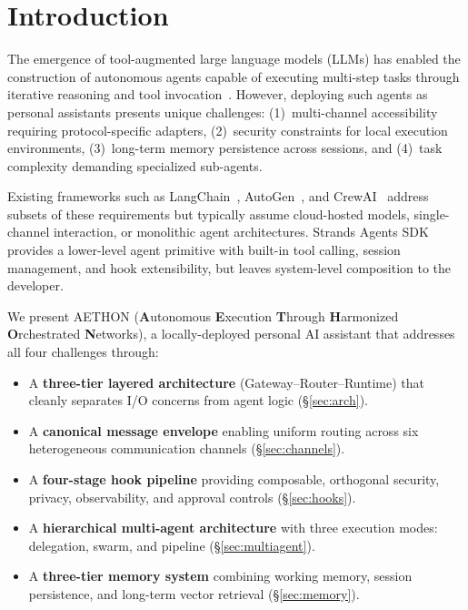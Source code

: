 \documentclass[9pt,twocolumn,letterpaper]{extarticle}
\begin{document}
\section{Introduction}
\label{sec:intro}

The emergence of tool-augmented large language models (LLMs) has enabled the construction of autonomous agents capable of executing multi-step tasks through iterative reasoning and tool invocation~\cite{schick2023toolformer,yao2023react}.
However, deploying such agents as personal assistants presents unique challenges: (1)~multi-channel accessibility requiring protocol-specific adapters, (2)~security constraints for local execution environments, (3)~long-term memory persistence across sessions, and (4)~task complexity demanding specialized sub-agents.

Existing frameworks such as LangChain~\cite{langchain2023}, AutoGen~\cite{wu2023autogen}, and CrewAI~\cite{crewai2024} address subsets of these requirements but typically assume cloud-hosted models, single-channel interaction, or monolithic agent architectures.
Strands Agents SDK~\cite{strands2025} provides a lower-level agent primitive with built-in tool calling, session management, and hook extensibility, but leaves system-level composition to the developer.

We present AETHON (\textbf{A}utonomous \textbf{E}xecution \textbf{T}hrough \textbf{H}armonized \textbf{O}rchestrated \textbf{N}etworks), a locally-deployed personal AI assistant that addresses all four challenges through:

\begin{itemize}[leftmargin=*,noitemsep,topsep=3pt]
  \item A \textbf{three-tier layered architecture} (Gateway--Router--Runtime) that cleanly separates I/O concerns from agent logic (\S\ref{sec:arch}).
  \item A \textbf{canonical message envelope} enabling uniform routing across six heterogeneous communication channels (\S\ref{sec:channels}).
  \item A \textbf{four-stage hook pipeline} providing composable, orthogonal security, privacy, observability, and approval controls (\S\ref{sec:hooks}).
  \item A \textbf{hierarchical multi-agent architecture} with three execution modes: delegation, swarm, and pipeline (\S\ref{sec:multiagent}).
  \item A \textbf{three-tier memory system} combining working memory, session persistence, and long-term vector retrieval (\S\ref{sec:memory}).
\end{itemize}
\end{document}
